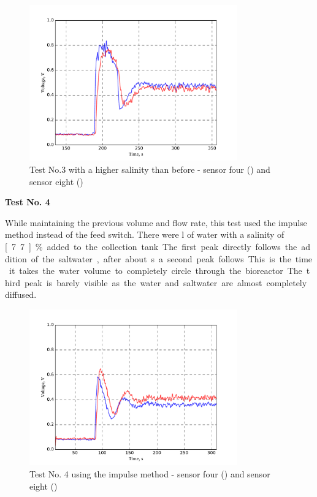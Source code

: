 \begin{figure}[H]
	\begin{center}
		\includegraphics[width=0.8\textwidth]{images/log080716_3.pdf} 
		\caption{Test No.3 with a higher salinity than before - sensor four (\drawline[blue]) and sensor eight (\drawline[red])}
		\label{fig:test3}
	\end{center}
\end{figure}

\textbf{Test No. 4}

While maintaining the previous volume and flow rate, this test used the impulse method instead of the feed switch. There were \unit[5]{l} of water with a salinity of \unit[7.7]{\%} added to the collection tank. The first peak directly follows the addition of the saltwater, after about \unit[50]{s} a second peak follows. This is the time it takes the water volume to completely circle through the bioreactor. The third peak is barely visible as the water and saltwater are almost completely diffused.

\begin{figure}[H]
	\begin{center}
		\includegraphics[width=0.8\textwidth]{images/log080716_4.pdf} 
		\caption{Test No. 4 using the impulse method - sensor four (\drawline[blue]) and sensor eight (\drawline[red])}
		\label{fig:test4}
	\end{center}
\end{figure}

